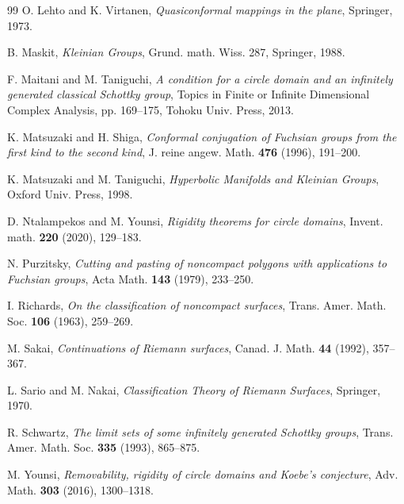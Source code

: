 \documentclass[12pt]{amsart}
\theoremstyle{plain}
\begin{document}
\begin{thebibliography}{99}
O. Lehto and K. Virtanen,
{\it Quasiconformal mappings in the plane},
Springer, 1973.

B. Maskit, {\it Kleinian Groups}, Grund. math. Wiss. 287, Springer, 1988.

F. Maitani and M. Taniguchi,
{\it A condition for a circle domain and an
infinitely generated classical Schottky group},
Topics in Finite or Infinite Dimensional Complex Analysis, pp. 169--175, Tohoku Univ. Press, 2013.

K. Matsuzaki and H. Shiga, 
{\it Conformal conjugation of Fuchsian groups from the first kind to the second kind}, 
J. reine angew. Math. {\bf 476} (1996), 191--200.

K. Matsuzaki and M. Taniguchi,
{\it Hyperbolic Manifolds and Kleinian Groups}, Oxford Univ. Press, 1998.

D. Ntalampekos and M. Younsi,
{\it Rigidity theorems for circle domains},
Invent. math. {\bf 220} (2020), 129--183.

 N. Purzitsky, {\it Cutting and pasting of noncompact polygons with applications to Fuchsian groups}, Acta Math. {\bf 143} (1979), 233--250.

I. Richards,
{\it On the classification of noncompact surfaces}, 
Trans. Amer. Math. Soc. {\bf 106} (1963), 259--269.

M. Sakai, {\it Continuations of Riemann surfaces}, Canad. J. Math. {\bf 44} (1992), 357--367.

L. Sario and M. Nakai, {\it Classification Theory of Riemann Surfaces}, Springer, 1970.

R. Schwartz, 
{\it The limit sets of some infinitely generated Schottky groups}, 
Trans. Amer. Math. Soc. {\bf 335} (1993), 865--875. 

M. Younsi,
{\it Removability, rigidity of circle domains and Koebe's conjecture},
Adv. Math. {\bf 303} (2016), 1300--1318.

\end{thebibliography}
\end{document}
